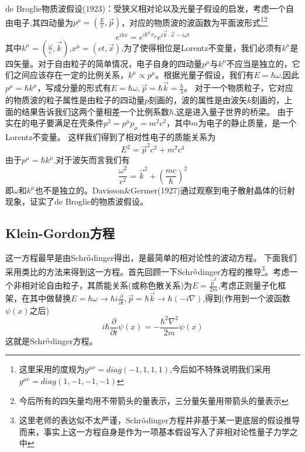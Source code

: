 de Broglie物质波假设(1923)：受狭义相对论以及光量子假设的启发，考虑一个自由电子,其四动量为$p^{\mu}=(\frac{{E}}{c},\vec{p})$，对应的物质波的波函数为平面波形式\footnote{这里采用的度规为$g^{\mu\nu}=diag(-1,1,1,1)$,今后如不特殊说明我们采用$g^{\mu\nu}=diag(1,-1,-1,-1)$}\footnote{今后所有的四矢量均用不带箭头的量表示，三分量矢量用带箭头的量表示}
\begin{equation}
    e^{ikx}=e^{ik^{\mu}x_{\mu}}e^{i\vec{k}\cdot \vec{x}-i \omega t}
\end{equation}
其中$k^{\mu}=(\frac{\omega}{c},\vec{k})$,$x^{\mu}=(ct,\vec{x})$,为了使得相位是Lorentz不变量，我们必须有$k^{\mu}$是四矢量。对于自由粒子的简单情况，电子自身的四动量$p^{\mu}$与$k^{\mu}$不应当是独立的，它们之间应该存在一定的比例关系，$k^{\mu}\propto p^{\mu}$。根据光量子假设，我们有$E=\hbar \omega$,因此$p^{\mu}=\hbar k^{\mu}$，写成分量的形式有$E=\hbar \omega,\vec{p}=\hbar \vec{k}=\frac{h}{\lambda}$。
对于一个物质粒子，它对应的物质波的粒子属性是由粒子的四动量$p$刻画的，波的属性是由波矢$k$刻画的，上面的结果告诉我们这两个量相差一个比例系数$\hbar$,这是进入量子世界的桥梁。
由于实在的电子要满足在壳条件$p^{2}=p^{\mu}p_{\mu}=m^{2}c^{2}$，其中$m$为电子的静止质量，是一个Lorentz不变量。
这样我们得到了相对性电子的质能关系为
\begin{equation}
    \label{zhineng}
    E^{2}=\vec{p}^{2}c^{2}+m^{2}c^{4}
\end{equation}
由于$p^{\mu}=\hbar k^{\mu}$,对于波矢而言我们有
\begin{equation}
    \label{2}
    \frac{\omega^{2}}{c^{2}}=\vec{k}^{2}+ \left( \frac{mc}{\hbar} \right)^{2}
\end{equation}
即$\omega$和$k^{\mu}$也不是独立的。Davisson$\&$Germer(1927)通过观察到电子散射晶体的衍射现象，证实了de Broglie的物质波假设。
\subsection{Klein-Gordon方程}
这一方程最早是由Schr$\ddot{\rm{o}}$dinger得出，是最简单的相对论性的波动方程。
下面我们采用类比的方法来得到这一方程。首先回顾一下Schr$\ddot{\rm{o}}$dinger方程的推导\footnote{这里老师的表达似不太严谨，Schr$\ddot{\rm{o}}$dinger方程并非基于某一更底层的假设推导而来，事实上这一方程自身是作为一项基本假设写入了非相对论性量子力学之中}。考虑一个非相对论自由粒子，其质能关系(或称色散关系)为$E=\frac{\vec{p}^{2}}{2m}$,考虑正则量子化框架，在其中做替换$E=\hbar \omega \rightarrow \hbar i \frac{\partial}{\partial t}, \vec{p}=\hbar\vec{k} \rightarrow \hbar (-i \nabla)$,得到(作用到一个波函数$\psi(x)$之后)
\begin{equation}
i\hbar\frac{\partial}{\partial t}\psi(x)=-\frac{\hbar^{2}\nabla^{2}}{2m}\psi(x)
\end{equation}
这就是Schr$\ddot{\rm{o}}$dinger方程。

